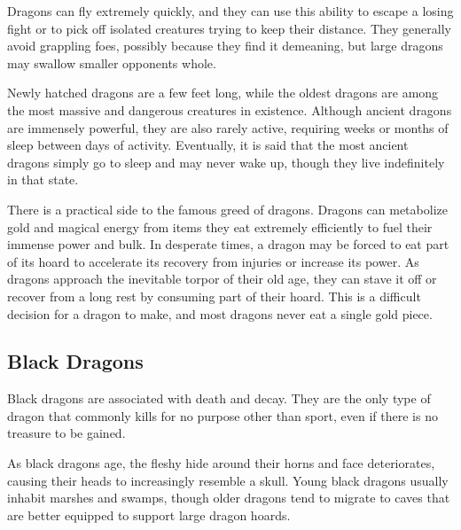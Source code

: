       Dragons can fly extremely quickly, and they can use this ability to escape a losing fight or to pick off isolated creatures trying to keep their distance.
      They generally avoid grappling foes, possibly because they find it demeaning, but large dragons may swallow smaller opponents whole.

      Newly hatched dragons are a few feet long, while the oldest dragons are among the most massive and dangerous creatures in existence.
      Although ancient dragons are immensely powerful, they are also rarely active, requiring weeks or months of sleep between days of activity.
      Eventually, it is said that the most ancient dragons simply go to sleep and may never wake up, though they live indefinitely in that state.

      There is a practical side to the famous greed of dragons.
      Dragons can metabolize gold and magical energy from items they eat extremely efficiently to fuel their immense power and bulk.
      In desperate times, a dragon may be forced to eat part of its hoard to accelerate its recovery from injuries or increase its power.
      As dragons approach the inevitable torpor of their old age, they can stave it off or recover from a long rest by consuming part of their hoard.
      This is a difficult decision for a dragon to make, and most dragons never eat a single gold piece.
  
      
    \subsection{Black Dragons}
      
      Black dragons are associated with death and decay.
      They are the only type of dragon that commonly kills for no purpose other than sport, even if there is no treasure to be gained.
    
      As black dragons age, the fleshy hide around their horns and face deteriorates, causing their heads to increasingly resemble a skull.
      Young black dragons usually inhabit marshes and swamps, though older dragons tend to migrate to caves that are better equipped to support large dragon hoards.
    

